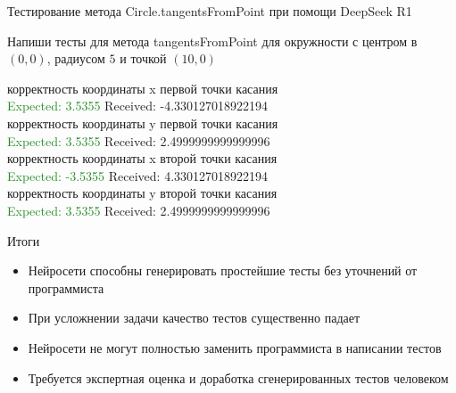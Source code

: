 \documentclass[aspectratio=169,12pt]{beamer}
\newcommand{\greencheck}{{\color{ForestGreen}\Checkmark}}
\newcommand{\redsolid}{{\color{BrickRed}\XSolid}}
\begin{document}
\begin{frame}[fragile]{Тестирование метода Circle.tangentsFromPoint при помощи DeepSeek R1}
	\begin{leftBox}
		Напиши тесты для метода tangentsFromPoint для окружности с центром в $(0,0)$, радиусом $5$ и точкой $(10, 0)$
	\end{leftBox}
	
	\begin{rightBox}
		\redsolid корректность координаты x первой точки касания
		\\\textcolor{ForestGreen}{Expected: 3.5355} 
		\textcolor{BrickRed}{Received: -4.330127018922194} 
		\\\redsolid корректность координаты y первой точки касания
		\\\textcolor{ForestGreen}{Expected: 3.5355} 
		\textcolor{BrickRed}{Received: 2.4999999999999996} 
		\\\redsolid корректность координаты x второй точки касания
		\\\textcolor{ForestGreen}{Expected: -3.5355} 
		\textcolor{BrickRed}{Received: 4.330127018922194} 
		\\\redsolid корректность координаты y второй точки касания
		\\\textcolor{ForestGreen}{Expected: 3.5355} 
		\textcolor{BrickRed}{Received: 2.4999999999999996} 
	\end{rightBox}
\end{frame}

\begin{frame}{Итоги}
	\begin{itemize}
		\item Нейросети способны генерировать простейшие тесты без уточнений от программиста
		\item При усложнении задачи качество тестов существенно падает
		\item Нейросети не могут полностью заменить программиста в написании тестов
		\item Требуется экспертная оценка и доработка сгенерированных тестов человеком
	\end{itemize}
\end{frame}
\end{document}
